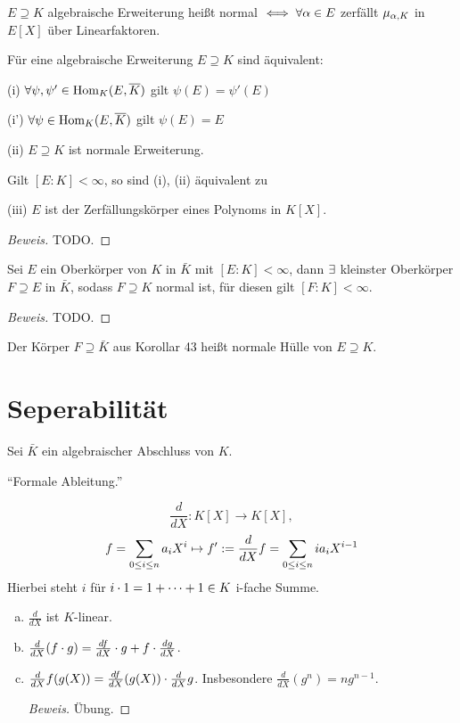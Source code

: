\documentclass[a4paper]{report}
\begin{document}
\begin{whg*}
$E \supseteq K$ algebraische Erweiterung heißt normal $\iff \forall \alpha \in E$ zerfällt $\mu_{\alpha, K}$ in $E[X]$ über Linearfaktoren.
\end{whg*}
\begin{satz}
  Für eine algebraische Erweiterung $E \supseteq K$ sind äquivalent:
    \item (i) $\forall \psi, \psi' \in \operatorname{Hom}_{K}(E, \overline K)$ gilt $\psi(E) = \psi'(E)$
    \item (i') $\forall \psi \in \operatorname{Hom}_{K}(E, \overline K)$ gilt $\psi(E) = E$
    \item (ii) $E \supseteq K$ ist normale Erweiterung.
    \item Gilt $[E : K] < \infty$, so sind (i), (ii) äquivalent zu
    \item (iii) $E$ ist der Zerfällungskörper eines Polynoms in $K[X]$.
\begin{proof}[Beweis]
TODO.
\end{proof}
\end{satz}

\begin{kor}
  Sei $E$ ein Oberkörper von $K$ in $\bar K$ mit $[E:K] < \infty$, dann $\exists$ kleinster Oberkörper $F \supseteq E$ in $\bar K$, sodass $F \supseteq K$ normal ist, für diesen gilt $[F:K] < \infty$.
  \begin{proof}[Beweis]
    TODO.
  \end{proof}
\end{kor}

\begin{defi}
Der Körper $F \supseteq \bar K$ aus Korollar 43 heißt normale Hülle von $E \supseteq K$.
\end{defi}

\section{Seperabilität}
Sei $\bar K$ ein algebraischer Abschluss von $K$.
\begin{vor*}
 ``Formale Ableitung.''
\end{vor*}

\begin{defi}
  \[\frac d{dX}: K[X] \to K[X],\]
  \[f = \sum_{0 \le i \le n}a_{i}X^{i} \mapsto f':= \frac d{dX}f = \sum_{0 \le i \le n}ia_{i}X^{i-1}\]
  Hierbei steht $i$ für $i \cdot 1 = 1 + \cdots + 1 \in K$ i-fache Summe.
\end{defi}

\begin{prop}[Rechenregeln]\item
\begin{enumerate}[(a)]
  \item $\frac d{dX}$ ist $K$-linear.
  \item $\frac d{dX}(f\cdot g) = \frac {df}{dX} \cdot g + f \cdot \frac {dg}{dX}$.
  \item $\frac d{dX} f(g(X)) = \frac {df}{dX}(g(X)) \cdot \frac d{dX}g$. Insbesondere $\frac d{dX}(g^{n}) = ng^{n-1}$.
        \begin{proof}[Beweis]Übung.\qedhere
        \end{proof}
\end{enumerate}
\end{prop}
\end{document}
